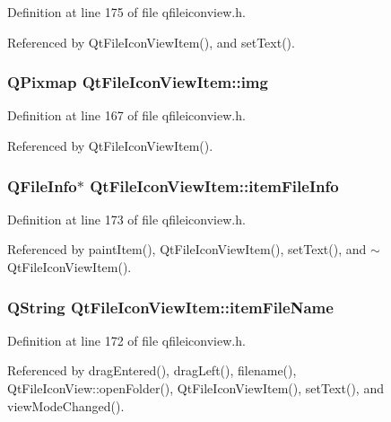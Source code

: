 Definition at line 175 of file qfileiconview.h.

Referenced by Qt\-File\-Icon\-View\-Item(), and set\-Text().
\subsubsection{\setlength{\rightskip}{0pt plus 5cm}QPixmap {\bf Qt\-File\-Icon\-View\-Item::img}}\label{classQtFileIconViewItem_QtFileIconViewItemo0}




Definition at line 167 of file qfileiconview.h.

Referenced by Qt\-File\-Icon\-View\-Item().
\subsubsection{\setlength{\rightskip}{0pt plus 5cm}QFile\-Info$\ast$ {\bf Qt\-File\-Icon\-View\-Item::item\-File\-Info}\hspace{0.3cm}{\tt  [protected]}}\label{classQtFileIconViewItem_QtFileIconViewItemp1}




Definition at line 173 of file qfileiconview.h.

Referenced by paint\-Item(), Qt\-File\-Icon\-View\-Item(), set\-Text(), and $\sim$Qt\-File\-Icon\-View\-Item().
\subsubsection{\setlength{\rightskip}{0pt plus 5cm}QString {\bf Qt\-File\-Icon\-View\-Item::item\-File\-Name}\hspace{0.3cm}{\tt  [protected]}}\label{classQtFileIconViewItem_QtFileIconViewItemp0}




Definition at line 172 of file qfileiconview.h.

Referenced by drag\-Entered(), drag\-Left(), filename(), Qt\-File\-Icon\-View::open\-Folder(), Qt\-File\-Icon\-View\-Item(), set\-Text(), and view\-Mode\-Changed().
